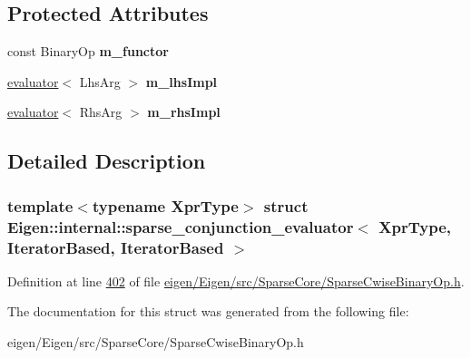 \subsection*{Protected Attributes}
\begin{DoxyCompactItemize}
\item 
\mbox{\label{struct_eigen_1_1internal_1_1sparse__conjunction__evaluator_3_01_xpr_type_00_01_iterator_based_00_01_iterator_based_01_4_a30afc564228923acfd574f7ce7c8181f}} 
const Binary\+Op {\bfseries m\+\_\+functor}
\item 
\mbox{\label{struct_eigen_1_1internal_1_1sparse__conjunction__evaluator_3_01_xpr_type_00_01_iterator_based_00_01_iterator_based_01_4_ace0c746111bf79eb3aa05c60dbdb805e}} 
\hyperlink{struct_eigen_1_1internal_1_1evaluator}{evaluator}$<$ Lhs\+Arg $>$ {\bfseries m\+\_\+lhs\+Impl}
\item 
\mbox{\label{struct_eigen_1_1internal_1_1sparse__conjunction__evaluator_3_01_xpr_type_00_01_iterator_based_00_01_iterator_based_01_4_a7b5aa2122d9a07eae08b9e29b4152b6c}} 
\hyperlink{struct_eigen_1_1internal_1_1evaluator}{evaluator}$<$ Rhs\+Arg $>$ {\bfseries m\+\_\+rhs\+Impl}
\end{DoxyCompactItemize}


\subsection{Detailed Description}
\subsubsection*{template$<$typename Xpr\+Type$>$\newline
struct Eigen\+::internal\+::sparse\+\_\+conjunction\+\_\+evaluator$<$ Xpr\+Type, Iterator\+Based, Iterator\+Based $>$}



Definition at line \hyperlink{eigen_2_eigen_2src_2_sparse_core_2_sparse_cwise_binary_op_8h_source_l00402}{402} of file \hyperlink{eigen_2_eigen_2src_2_sparse_core_2_sparse_cwise_binary_op_8h_source}{eigen/\+Eigen/src/\+Sparse\+Core/\+Sparse\+Cwise\+Binary\+Op.\+h}.



The documentation for this struct was generated from the following file\+:\begin{DoxyCompactItemize}
\item 
eigen/\+Eigen/src/\+Sparse\+Core/\+Sparse\+Cwise\+Binary\+Op.\+h\end{DoxyCompactItemize}
